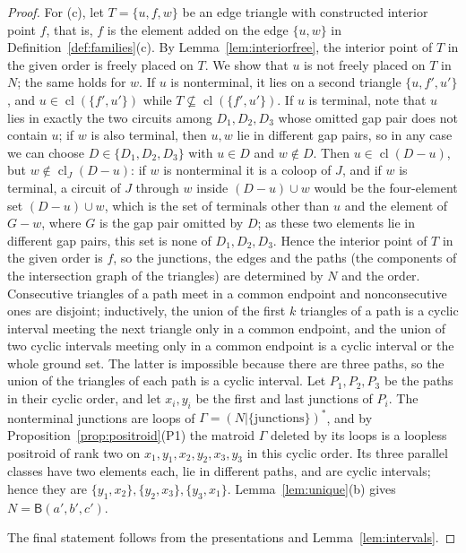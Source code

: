 \documentclass[11pt]{amsart}
\theoremstyle{definition}
\theoremstyle{remark}
\numberwithin{equation}{section}
\newcommand{\cl}{\operatorname{cl}}
\newcommand{\FB}{\mathsf{B}}
\begin{document}
\begin{proof}
For (c), let $T=\{u,f,w\}$ be an edge triangle with constructed interior point $f$, that is, $f$ is the element added on the edge $\{u,w\}$ in Definition~\ref{def:families}(c). By Lemma~\ref{lem:interiorfree}, the interior point of $T$ in the given order is freely placed on $T$. We show that $u$ is not freely placed on $T$ in $N$; the same holds for $w$. If $u$ is nonterminal, it lies on a second triangle $\{u,f',u'\}$, and $u\in\cl(\{f',u'\})$ while $T\not\subseteq\cl(\{f',u'\})$. If $u$ is terminal, note that $u$ lies in exactly the two circuits among $D_1,D_2,D_3$ whose omitted gap pair does not contain $u$; if $w$ is also terminal, then $u,w$ lie in different gap pairs, so in any case we can choose $D\in\{D_1,D_2,D_3\}$ with $u\in D$ and $w\notin D$. Then $u\in\cl(D-u)$, but $w\notin\cl_J(D-u)$: if $w$ is nonterminal it is a coloop of $J$, and if $w$ is terminal, a circuit of $J$ through $w$ inside $(D-u)\cup w$ would be the four-element set $(D-u)\cup w$, which is the set of terminals other than $u$ and the element of $G-w$, where $G$ is the gap pair omitted by $D$; as these two elements lie in different gap pairs, this set is none of $D_1,D_2,D_3$. Hence the interior point of $T$ in the given order is $f$, so the junctions, the edges and the paths (the components of the intersection graph of the triangles) are determined by $N$ and the order. Consecutive triangles of a path meet in a common endpoint and nonconsecutive ones are disjoint; inductively, the union of the first $k$ triangles of a path is a cyclic interval meeting the next triangle only in a common endpoint, and the union of two cyclic intervals meeting only in a common endpoint is a cyclic interval or the whole ground set. The latter is impossible because there are three paths, so the union of the triangles of each path is a cyclic interval. Let $P_1,P_2,P_3$ be the paths in their cyclic order, and let $x_i,y_i$ be the first and last junctions of $P_i$. The nonterminal junctions are loops of $\Gamma=(N|\{\text{junctions}\})^*$, and by Proposition~\ref{prop:positroid}(P1) the matroid $\Gamma$ deleted by its loops is a loopless positroid of rank two on $x_1,y_1,x_2,y_2,x_3,y_3$ in this cyclic order. Its three parallel classes have two elements each, lie in different paths, and are cyclic intervals; hence they are $\{y_1,x_2\},\{y_2,x_3\},\{y_3,x_1\}$. Lemma~\ref{lem:unique}(b) gives $N=\FB(a',b',c')$.

The final statement follows from the presentations and Lemma~\ref{lem:intervals}.
\end{proof}
\end{document}

